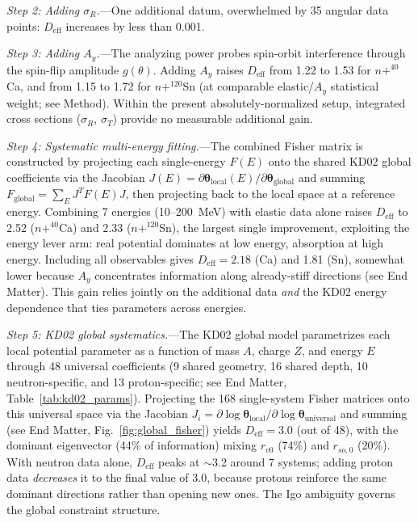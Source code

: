 \documentclass[aps,prl,reprint,superscriptaddress,showpacs]{revtex4-2}
\begin{document}
\emph{Step 2: Adding $\sigma_R$.}---One additional datum, overwhelmed by 35 angular data points: $D_\mathrm{eff}$ increases by less than 0.001.

\emph{Step 3: Adding $A_y$.}---The analyzing power probes spin-orbit interference through the spin-flip amplitude $g(\theta)$. Adding $A_y$ raises $D_\mathrm{eff}$ from 1.22 to 1.53 for $n+^{40}$Ca, and from 1.15 to 1.72 for $n+^{120}$Sn (at comparable elastic/$A_y$ statistical weight; see Method). Within the present absolutely-normalized setup, integrated cross sections ($\sigma_R$, $\sigma_T$) provide no measurable additional gain.

\emph{Step 4: Systematic multi-energy fitting.}---The combined Fisher matrix is constructed by projecting each single-energy $F(E)$ onto the shared KD02 global coefficients via the Jacobian $J(E) = \partial\boldsymbol{\theta}_\mathrm{local}(E)/\partial\boldsymbol{\theta}_\mathrm{global}$ and summing $F_\mathrm{global} = \sum_E J^T F(E) J$, then projecting back to the local space at a reference energy. Combining 7 energies (10--200~MeV) with elastic data alone raises $D_\mathrm{eff}$ to 2.52 ($n+^{40}$Ca) and 2.33 ($n+^{120}$Sn), the largest single improvement, exploiting the energy lever arm: real potential dominates at low energy, absorption at high energy. Including all observables gives $D_\mathrm{eff} = 2.18$ (Ca) and 1.81 (Sn), somewhat lower because $A_y$ concentrates information along already-stiff directions (see End Matter). This gain relies jointly on the additional data \emph{and} the KD02 energy dependence that ties parameters across energies.

\emph{Step 5: KD02 global systematics.}---The KD02 global model parametrizes each local potential parameter as a function of mass $A$, charge $Z$, and energy $E$ through 48 universal coefficients (9 shared geometry, 16 shared depth, 10 neutron-specific, and 13 proton-specific; see End Matter, Table~\ref{tab:kd02_params}). Projecting the 168 single-system Fisher matrices onto this universal space via the Jacobian $J_i = \partial\log\boldsymbol{\theta}_\mathrm{local}/\partial\log\boldsymbol{\theta}_\mathrm{universal}$ and summing (see End Matter, Fig.~\ref{fig:global_fisher}) yields $D_\mathrm{eff} = 3.0$ (out of 48), with the dominant eigenvector (44\% of information) mixing $r_{v0}$ (74\%) and $r_{so,0}$ (20\%). With neutron data alone, $D_\mathrm{eff}$ peaks at $\sim$3.2 around 7 systems; adding proton data \emph{decreases} it to the final value of 3.0, because protons reinforce the same dominant directions rather than opening new ones. The Igo ambiguity governs the global constraint structure.
\end{document}
